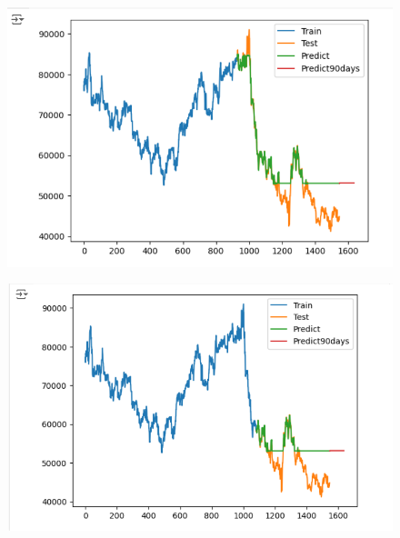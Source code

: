 \documentclass{article}
\begin{document}
\begin{multicols}{2}
\begin{figure}[H]
    \centering
    \begin{minipage}{0.15\textwidth}
    \centering
    \includegraphics[width=1\textwidth]{Image/GradientBoosting/SAMSUNG_90_6_4_GradientBoostingRegressor.png}
   
    \label{fig:1}
    \end{minipage}%
    \begin{minipage}{0.15\textwidth}
    \centering
    \includegraphics[width=1\textwidth]{Image/GradientBoosting/SAMSUNG_90_7_3_GradientBoostingRegressor.png}
  

\end{minipage}
\end{figure}
\end{multicols}
\end{document}

